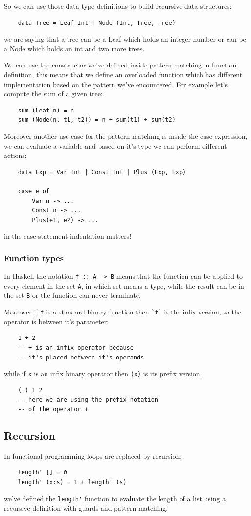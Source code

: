 So we can use those data type definitions to build recursive data structures:
\begin{verbatim}
    data Tree = Leaf Int | Node (Int, Tree, Tree)
\end{verbatim}
we are saying that a tree can be a Leaf which holds an integer number or can be a Node which holds an int and two more trees.

We can use the constructor we've defined inside pattern matching in function definition, this means that we define an overloaded function which has different implementation based on the pattern we've encountered.
For example let's compute the sum of a given tree:
\begin{verbatim}
    sum (Leaf n) = n
    sum (Node(n, t1, t2)) = n + sum(t1) + sum(t2)
\end{verbatim}

Moreover another use case for the pattern matching is inside the case expression, we can evaluate a variable and based on it's type we can perform different actions:
\begin{verbatim}
    data Exp = Var Int | Const Int | Plus (Exp, Exp)

    case e of
        Var n -> ...
        Const n -> ...
        Plus(e1, e2) -> ...
\end{verbatim}
in the case statement indentation matters!

\subsubsection{Function types}
In Haskell the notation \verb|f :: A -> B| means that the function can be applied to every element in the set \verb|A|, in which set means a type, while the result can be in the set \verb|B| or the function can never terminate.

Moreover if \verb|f| is a standard binary function then \verb|`f`| is the infix version, so the operator is between it's parameter:
\begin{verbatim}
    1 + 2
    -- + is an infix operator because
    -- it's placed between it's operands
\end{verbatim}
while if \verb|x| is an infix binary operator then \verb|(x)| is its prefix version.
\begin{verbatim}
    (+) 1 2
    -- here we are using the prefix notation
    -- of the operator +
\end{verbatim}

\subsection{Recursion}
In functional programming loops are replaced by recursion:
\begin{verbatim}
    length' [] = 0
    length' (x:s) = 1 + length' (s)
\end{verbatim}
we've defined the \verb|length'| function to evaluate the length of a list using a recursive definition with guards and pattern matching.

